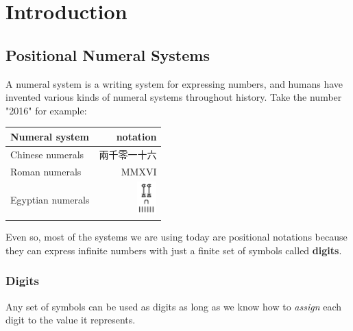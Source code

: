 \documentclass[../thesis.tex]{subfiles}
\begin{document}
\graphicspath{ {images/}{../images/} }

\chapter{Introduction}\label{introduction}

\section{Positional Numeral Systems}

A numeral system is a writing system for expressing numbers, and humans have
invented various kinds of numeral systems throughout history.
Take the number "2016"  for example:

\begin{center}
    \begin{tabular}{ | l | r | }
    \textbf{Numeral system} & \textbf{notation}  \\
    \hline
    Chinese numerals    & 兩千零一十六    \\
    Roman numerals      & MMXVI         \\
    Egyptian numerals   & \includegraphics[width=2em]{egyptian/2016.png} \\
    \end{tabular}
\end{center}

Even so, most of the systems we are using today are positional notations\cite{knuth1998art}
because they can express infinite numbers with just a finite set of symbols called \textbf{digits}.

\subsection{Digits}

Any set of symbols can be used as digits as long as we know how to \textit{assign}
each digit to the value it represents.
\end{document}

